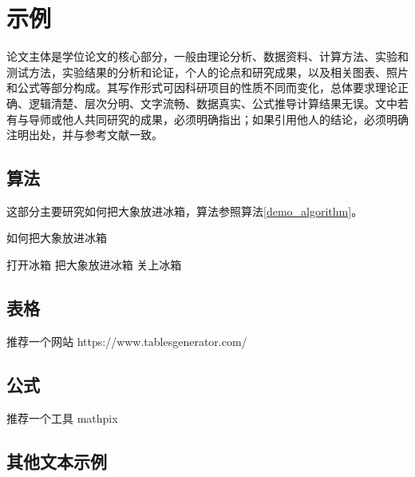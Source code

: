 \documentclass[a4paper,AutoFakeBold,oneside,12pt]{book}
\begin{document}


\blankmatter
  


\blankmatter
  




\tableofcontents %


\newpage\mainmatter
{}
\chapter{示例}
论文主体是学位论文的核心部分，一般由理论分析、数据资料、计算方法、实验和测试方法，实验结果的分析和论证，个人的论点和研究成果，以及相关图表、照片和公式等部分构成。其写作形式可因科研项目的性质不同而变化，总体要求理论正确、逻辑清楚、层次分明、文字流畅、数据真实、公式推导计算结果无误。文中若有与导师或他人共同研究的成果，必须明确指出；如果引用他人的结论，必须明确注明出处，并与参考文献一致。


\section{算法}
这部分主要研究如何把大象放进冰箱，算法参照算法\ref{demo_algorithm}。
\begin{algorithm} 
	\begin{spacing}{1.3}
		\caption{如何把大象放进冰箱} 
		\label{demo_algorithm}
		\begin{algorithmic}[1] 
			\State 打开冰箱
            \State 把大象放进冰箱
            \State 关上冰箱
		\end{algorithmic}  
	\end{spacing}
\end{algorithm}
\section{表格}
推荐一个网站 https://www.tablesgenerator.com/
\section{公式}
推荐一个工具 mathpix
\section{其他文本示例}
\end{document}
